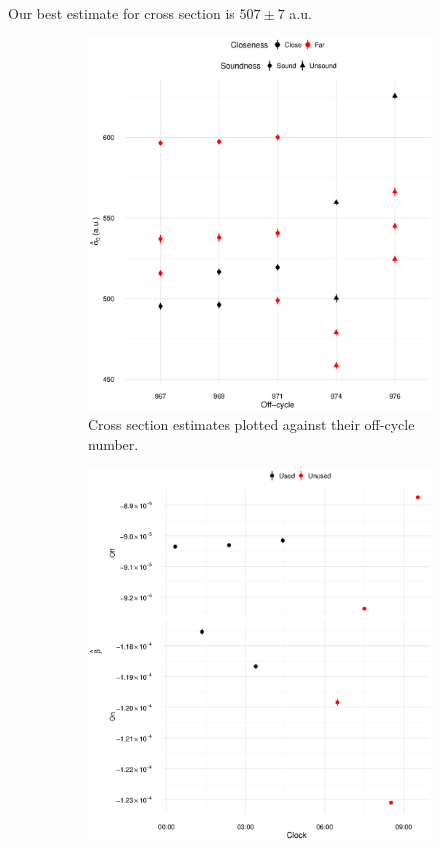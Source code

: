 \documentclass[reprint]{revtex4-1}
\newcommand{\scl}{.4}
\begin{document}
Our best estimate for cross section is $507 \pm 7$ a.u. 

\begin{figure}
\begin{subfigure}{.5\textwidth}
\includegraphics[scale=\scl]{img/Cross-Section_all.eps}
\caption{Cross section estimates plotted against their off-cycle number.\label{fig:CS-all}}
\end{subfigure}
\begin{subfigure}{.5\textwidth}
\includegraphics[scale=\scl]{img/Slopes-2012_big.eps}

\end{subfigure}
\end{figure}
\end{document}
